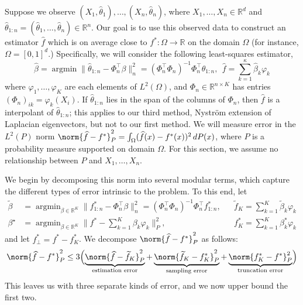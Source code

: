 \documentclass{article}
\newcommand{\Reals}{\mathbb{R}}
\newcommand{\1}{\mathbf{1}}
\DeclareMathOperator*{\argmin}{argmin}
\newcommand{\Leb}{L}
\newcommand{\wt}[1]{\widetilde{#1}}
\newcommand{\wh}[1]{\widehat{#1}}
\theoremstyle{definition}
\theoremstyle{remark}
\begin{document}
Suppose we observe $(X_1,\wh{\theta}_1),\ldots,(X_n,\wh{\theta}_n)$, where $X_1,\ldots,X_n \in \Reals^d$ and $\wh{\theta}_{1:n} = (\wh{\theta}_1,\ldots,\wh{\theta}_n) \in \Reals^n$. Our goal is to use this observed data to construct an estimator $\wh{f}$ which is on average close to $f^{\ast}: \Omega \to \Reals$ on the domain $\Omega$ (for instance, $\Omega = [0,1]^d$.) Specifically, we will consider the following least-squares estimator,
\begin{equation*}
\wh{\beta} = \argmin \| \wh{\theta}_{1:n} - \Phi_n^{\top} \beta \|_n^2 = (\Phi_n^\top \Phi_n)^{-1}\Phi_n^{\top} \wh{\theta}_{1:n},~~ \wh{f} = \sum_{k = 1}^{\kappa} \wh{\beta}_k \varphi_k
\end{equation*}
where $\varphi_1,\ldots,\varphi_{K}$ are each elements of $\Leb^2(\Omega)$, and $\Phi_n \in \Reals^{n \times K}$ has entries $(\Phi_{n})_{ik} = \varphi_k(X_i)$. If $\wh{\theta}_{1:n}$ lies in the span of the columns of $\Phi_n$, then $\wh{f}$ is a interpolant of $\wh{\theta}_{1:n}$; this applies to our third method, Nystr\"{o}m extension of Laplacian eigenvectors, but not to our first method. We will measure error in the $\Leb^2(P)$ norm $\norm{\wh{f} - f^{\ast}}_P^2 = \int_{\Omega} (\wh{f}(x) - f^{\ast}(x))^2 \,dP(x)$, where $P$ is a probability measure supported on domain $\Omega$. For this section, we assume no relationship between $P$ and $X_1,\ldots,X_n$.

We begin by decomposing this norm into several modular terms, which capture the different types of error intrinsic to the problem. To this end, let
\begin{align*}
\wt{\beta} & = \argmin_{\beta \in \Reals^K} \|f^{\ast}_{1:n} - \Phi_n^{\top} \beta \|_n^2 = (\Phi_n^\top \Phi_n)^{-1}\Phi_n^{\top} {f}^{\ast}_{1:n},&& \wt{f}_K = \sum_{k = 1}^{K} \wt{\beta}_k \varphi_k \\ 
\beta^{\star} & = \argmin_{\beta \in \Reals^K} \|f^{\ast} - \sum_{k = 1}^{K} \beta_k \varphi_k \|_P^2,&& f_K^{\ast} = \sum_{k = 1}^{K} \beta_k^{\ast} \varphi_k
\end{align*}
and let $f_{\perp}^{\ast} = f^{\ast} - f_{K}^{\ast}$. We decompose $\norm{\wh{f} - f^{\ast}}_P^2$ as follows:
\begin{equation*}
\norm{\wh{f} - f^{\ast}}_P^2 \leq 3\Bigl(\underbrace{\norm{\wh{f} - \wt{f}_K}_P^2}_{\textrm{estimation error}} + \underbrace{\norm{\wt{f}_K - f_K^{\ast}}_P^2}_{\textrm{sampling error}} + \underbrace{\norm{f_K^{\ast} - f^{\ast}}_P^2}_{\textrm{truncation error}}\Bigr)
\end{equation*}
This leaves us with three separate kinds of error, and we now upper bound the first two.
\end{document}
